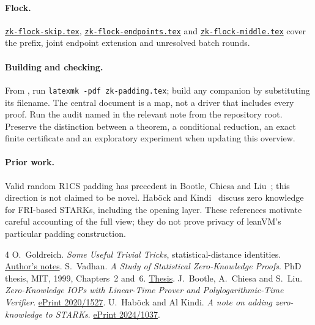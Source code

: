 \documentclass[11pt]{article}
\theoremstyle{definition}
\newcommand{\researchnote}[1]{\href{../#1.tex}{\nolinkurl{#1.tex}}}
\begin{document}
\paragraph{Flock.} \researchnote{zk-flock-skip}, \researchnote{zk-flock-endpoints} and \researchnote{zk-flock-middle} cover the prefix, joint endpoint extension and unresolved batch rounds.

\par\endgroup

\paragraph{Building and checking.} From , run \texttt{latexmk -pdf zk-padding.tex}; build any companion by substituting its filename. The central document is a map, not a driver that includes every proof. Run the audit named in the relevant note from the repository root. Preserve the distinction between a theorem, a conditional reduction, an exact finite certificate and an exploratory experiment when updating this overview.

\paragraph{Prior work.} Valid random R1CS padding has precedent in Bootle, Chiesa and Liu~\cite{bcl}; this direction is not claimed to be novel. Hab\"ock and Kindi~\cite{hk} discuss zero knowledge for FRI-based STARKs, including the opening layer. These references motivate careful accounting of the full view; they do not prove privacy of leanVM's particular padding construction.

\begin{thebibliography}{4}
 O.~Goldreich. \emph{Some Useful Trivial Tricks}, statistical-distance identities. \href{https://www.wisdom.weizmann.ac.il/~/oded/tricks.html}{Author's notes}.
 S.~Vadhan. \emph{A Study of Statistical Zero-Knowledge Proofs}. PhD thesis, MIT, 1999, Chapters~2 and~6. \href{https://www.wisdom.weizmann.ac.il/~oded/PSX/salil-phd.pdf}{Thesis}.
 J.~Bootle, A.~Chiesa and S.~Liu. \emph{Zero-Knowledge IOPs with Linear-Time Prover and Polylogarithmic-Time Verifier}. \href{https://eprint.iacr.org/2020/1527}{ePrint 2020/1527}.
 U.~Hab\"ock and Al Kindi. \emph{A note on adding zero-knowledge to STARKs}. \href{https://eprint.iacr.org/2024/1037}{ePrint 2024/1037}.
\end{thebibliography}
\end{document}
